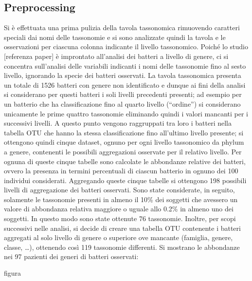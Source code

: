 \subsection{Preprocessing}
Si è effettuata una prima pulizia della tavola tassonomica rimuovendo caratteri speciali dai nomi delle tassonomie e si sono analizzate quindi la tavola e le osservazioni per ciascuna colonna indicante il livello tassonomico. Poiché lo studio [referenza paper] è improntato all’analisi dei batteri a livello di genere, ci si concentra sull’analisi delle variabili indicanti i nomi delle tassonomie fino al sesto livello, ignorando la specie dei batteri osservati. La tavola tassonomica presenta un totale di 1526 batteri con genere non identificato e dunque ai fini della analisi si considerano per questi batteri i soli livelli precedenti presenti; ad esempio per un batterio che ha classificazione fino al quarto livello (“ordine”) si considerano unicamente le prime quattro tassonomie eliminando quindi i valori mancanti per i successivi livelli. A questo punto vengono raggruppati tra loro i batteri nella tabella OTU che hanno la stessa classificazione fino all’ultimo livello presente; si ottengono quindi cinque dataset, ognuno per ogni livello tassonomico da phylum a genere, contenenti le possibili aggregazioni osservate per il relativo livello. Per ognuna di queste cinque tabelle sono calcolate le abbondanze relative dei batteri, ovvero la presenza in termini percentuali di ciascun batterio in ognuno dei 100 individui considerati. Aggregando queste cinque tabelle si ottengono 198 possibili livelli di aggregazione dei batteri osservati. Sono state considerate, in seguito, solamente le tassonomie presenti in almeno il 10\% dei soggetti che avessero un valore di abbondanza relativa maggiore o uguale allo 0.2\% in almeno uno dei soggetti. In questo modo sono state ottenute 76 tassonomie.
Inoltre, per scopi successivi nelle analisi, si decide di creare una tabella OTU contenente i batteri aggregati al solo livello di genere o superiore ove mancante (famiglia, genere, classe, …), ottenendo così 119 tassonomie differenti. 
Si mostrano le abbondanze nei 97 pazienti dei generi di batteri osservati:


figura  

